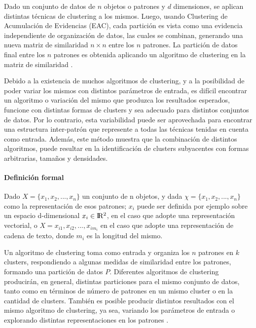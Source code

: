 \bigskip Dado un conjunto de datos de \(n\) objetos o patrones y \(d\) dimensiones, se aplican distintas técnicas de clustering a los mismos. Luego, usando Clustering de Acumulación de Evidencias (EAC), cada partición es vista como una evidencia independiente de organización de datos, las cuales se combinan, generando una nueva matriz de similaridad \(n \times n\) entre los \(n\) patrones. La partición de datos final entre los \(n\) patrones es obtenida aplicando un algoritmo de clustering en la matriz de similaridad \citep{fred2005combining}.

\bigskip Debido a la existencia de muchos algoritmos de clustering, y a la posibilidad de poder variar los mismos con distintos parámetros de entrada, es difícil encontrar un algoritmo o variación del mismo que produzca los resultados esperados, funcione con distintas formas de clusters y sea adecuado para distintos conjuntos de datos. Por lo contrario, esta variabilidad puede ser aprovechada para encontrar una estructura inter-patrón que represente a todas las técnicas tenidas en cuenta como entrada. Además, este método muestra que la combinación de distintos algoritmos, puede resultar en la identificación de clusters subyacentes con formas arbitrarias, tamaños y densidades.

\paragraph{Definición formal}
Dado \(X = \{x_1, x_2,... , x_n\}\) un conjunto de n objetos, y dada \(\chi = \{x_1, x_2,... , x_n\}\) como la representación de esos patrones; \(x_i\) puede ser definida por ejemplo sobre un espacio d-dimensional \(x_i \in \rm I\!R^2\), en el caso que adopte una representación vectorial, o \(X = x_{i1}, x_{i2},... , x_{im_i}\) en el caso que adopte una representación de cadena de texto, donde \(m_i\) es la longitud del mismo.

Un algoritmo de clustering toma  como entrada y organiza los \(n\) patrones en \(k\) clusters, respondiendo a algunas medidas de similaridad entre los patrones, formando una partición de datos \(P\). Diferentes algoritmos de clustering producirán, en general, distintas particiones para el mismo conjunto de datos, tanto como en términos de número de patrones en un mismo cluster o en la cantidad de clusters. También es posible producir distintos resultados con el mismo algoritmo de clustering, ya sea, variando los parámetros de entrada o explorando distintas representaciones en los patrones \citep{fred2005combining}.

